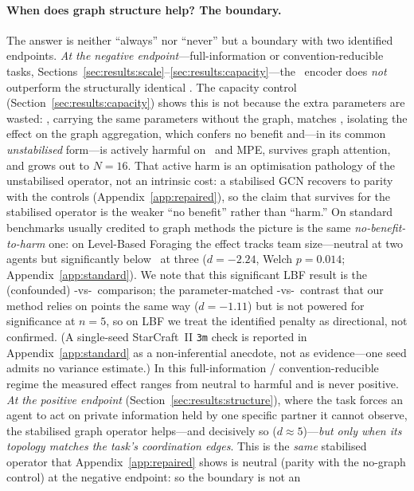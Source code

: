 \paragraph{When does graph structure help? The boundary.} The answer is
neither ``always'' nor ``never'' but a boundary with two identified
endpoints. \emph{At the negative endpoint}---full-information or
convention-reducible tasks, Sections~\ref{sec:results:scale}--\ref{sec:results:capacity}---the
\gnnqmix\ encoder does \emph{not} outperform the structurally identical
\qmix. The capacity control (Section~\ref{sec:results:capacity}) shows this
is not because the extra parameters are wasted: \mlpqmix, carrying the same
parameters without the graph, matches \qmix, isolating the effect on the
graph aggregation, which confers no benefit and---in its common
\emph{unstabilised} form---is actively harmful on \coordgrid\ and MPE,
survives graph attention, and grows out to $N{=}16$. That active harm is an
optimisation pathology of the unstabilised operator, not an intrinsic cost:
a stabilised GCN recovers to parity with the controls
(Appendix~\ref{app:repaired}), so the claim that survives for the stabilised
operator is the weaker ``no benefit'' rather than ``harm.'' On standard
benchmarks usually credited to graph methods the picture is the same
\emph{no-benefit-to-harm} one: on
Level-Based Foraging the effect tracks team size---neutral at two agents but
significantly below \qmix\ at three ($d=-2.24$, Welch $p=0.014$;
Appendix~\ref{app:standard}). We note that this significant LBF
result is the (confounded) \gnnqmix-vs-\qmix\ comparison; the parameter-matched
\gnnqmix-vs-\mlpqmix\ contrast that our method relies on points the same way
($d=-1.11$) but is not powered for significance at $n{=}5$, so on LBF we treat
the identified penalty as directional, not confirmed. (A single-seed StarCraft~II \texttt{3m} check
is reported in Appendix~\ref{app:standard} as a non-inferential anecdote, not
as evidence---one seed admits no variance estimate.) In this
full-information / convention-reducible regime the measured effect ranges from
neutral to harmful and is never positive.
\emph{At the positive endpoint} (Section~\ref{sec:results:structure}), where
the task forces an agent to act on private information held by one specific
partner it cannot observe, the stabilised graph operator helps---and
decisively so ($d\approx5$)---\emph{but only when its topology matches the
task's coordination edges}. This is the \emph{same} stabilised
operator that Appendix~\ref{app:repaired} shows is neutral (parity with the
no-graph control) at the negative endpoint: so the boundary is not an
